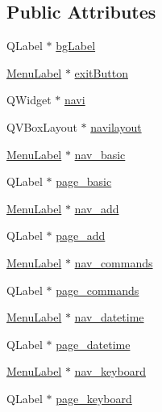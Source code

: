 \subsection*{Public Attributes}
\begin{DoxyCompactItemize}
\item 
Q\+Label $\ast$ \hyperlink{class_do_lah_1_1_help_window_a88c39ed85fafa3b519656839282189d9}{bg\+Label}
\item 
\hyperlink{class_do_lah_1_1_menu_label}{Menu\+Label} $\ast$ \hyperlink{class_do_lah_1_1_help_window_a64ca01a148e904b7308d6b63260dc199}{exit\+Button}
\item 
Q\+Widget $\ast$ \hyperlink{class_do_lah_1_1_help_window_a6e2ae58bc43415e0815cd4955be70fbc}{navi}
\item 
Q\+V\+Box\+Layout $\ast$ \hyperlink{class_do_lah_1_1_help_window_a1b08cbaf4888897b8c112e4c09465ff6}{navilayout}
\item 
\hyperlink{class_do_lah_1_1_menu_label}{Menu\+Label} $\ast$ \hyperlink{class_do_lah_1_1_help_window_a7666b67a7582cacc1a096b437f0ccbe7}{nav\+\_\+basic}
\item 
Q\+Label $\ast$ \hyperlink{class_do_lah_1_1_help_window_a03586bdc425dde0b8acf73de7185ce86}{page\+\_\+basic}
\item 
\hyperlink{class_do_lah_1_1_menu_label}{Menu\+Label} $\ast$ \hyperlink{class_do_lah_1_1_help_window_a348e296747ac017790790db15a4a370e}{nav\+\_\+add}
\item 
Q\+Label $\ast$ \hyperlink{class_do_lah_1_1_help_window_ae8706aef13943e8bac6299f5718bf613}{page\+\_\+add}
\item 
\hyperlink{class_do_lah_1_1_menu_label}{Menu\+Label} $\ast$ \hyperlink{class_do_lah_1_1_help_window_a7c8bcc6d7e7b4ca4315333643d7c7abd}{nav\+\_\+commands}
\item 
Q\+Label $\ast$ \hyperlink{class_do_lah_1_1_help_window_a05fd3b8109bc5c65723e40e5ff847bda}{page\+\_\+commands}
\item 
\hyperlink{class_do_lah_1_1_menu_label}{Menu\+Label} $\ast$ \hyperlink{class_do_lah_1_1_help_window_a4c087b164e2d387268c712aabd313d80}{nav\+\_\+datetime}
\item 
Q\+Label $\ast$ \hyperlink{class_do_lah_1_1_help_window_a22cdea890eeee709173df18f67028be9}{page\+\_\+datetime}
\item 
\hyperlink{class_do_lah_1_1_menu_label}{Menu\+Label} $\ast$ \hyperlink{class_do_lah_1_1_help_window_a25c2600e039d782ba4facfb44d0ca6a9}{nav\+\_\+keyboard}
\item 
Q\+Label $\ast$ \hyperlink{class_do_lah_1_1_help_window_aa02d6db9ccf96c9bc368db37d1480cb7}{page\+\_\+keyboard}

\end{DoxyCompactItemize}
